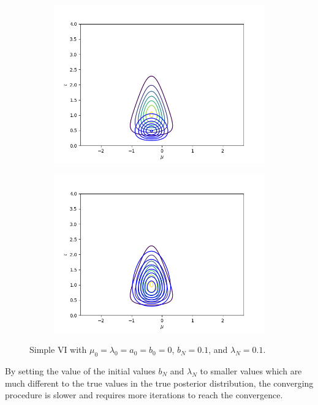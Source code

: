 \documentclass[11pt]{extarticle}
\newcommand{\0}{\mathbf{0}}
\renewcommand{\(}{\left(}
\renewcommand{\)}{\right)}
\theoremstyle{definition}
\begin{document}
\begin{enumerate}
\begin{figure}[!ht]
\begin{subfigure}{.4\textwidth}
			\centering
			\includegraphics[width=\linewidth]{2_4_2_3}
		\end{subfigure}
		\begin{subfigure}{.4\textwidth}
			\centering
			\includegraphics[width=\linewidth]{2_4_2_6}
		\end{subfigure}
		\caption{Simple VI with $\mu_{0} = \lambda_{0} = a_{0} = b_{0} = 0$, $b_{N} = 0.1$, and $\lambda_{N} = 0.1$.}
		\label{fig:2_4_2}
	\end{figure}
	\par By setting the value of the initial values $b_{N}$ and $\lambda_{N}$ to smaller values which are much different to the true values in the true posterior distribution, the converging procedure is slower and requires more iterations to reach the convergence.
	

\end{enumerate}
\end{document}
